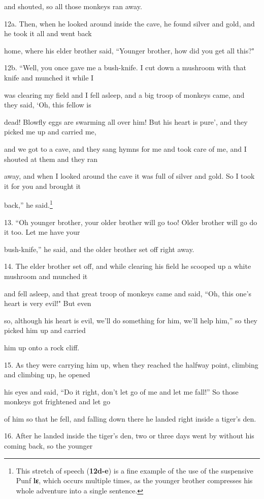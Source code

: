 and shouted, so all those monkeys ran away.

12a. Then, when he looked around inside the cave, he found silver and gold, and
he took it all and went back

home, where his elder brother said, ``Younger brother, how did you get all this?"


12b. ``Well, you once gave me a bush-knife. I cut down a mushroom with that knife
and munched it while I

was clearing my field and I fell asleep, and a big troop of monkeys came, and they
said, `Oh, this fellow is

dead! Blowfly eggs are swarming all over him! But his heart is pure', and they
picked me up and carried me,

and we got to a cave, and they sang hymns for me and took care of me, and I shouted
at them and they ran

away, and when I looked around the cave it was full of silver and gold. So I took
it for you and brought it

back,'' he said.\footnote{This stretch of speech (\textbf{12d-e}) is a fine example of the use of the suspensive Punf \textbf{lɛ}, which occurs multiple times, as the younger brother compresses his whole adventure into a single sentence.}

13. ``Oh younger brother, your older brother will go too! Older brother will go
do it too. Let me have your

bush-knife,'' he said, and the older brother set off right away.

14. The elder brother set off, and while clearing his field he scooped up a white
mushroom and munched it

and fell asleep, and that great troop of monkeys came and said, ``Oh, this one's
heart is very evil!" But even

so, although his heart is evil, we'll do something for him, we'll help him,''
so they picked him up and carried

him up onto a rock cliff.

15. As they were carrying him up, when they reached the halfway point, climbing
and climbing up, he opened

his eyes and said, ``Do it right, don't let go of me and let me fall!'' So those
monkeys got frightened and let go

of him so that he fell, and falling down there he landed right inside a tiger's
den.

16. After he landed inside the tiger's den, two or three days went by without his
coming back, so the younger

